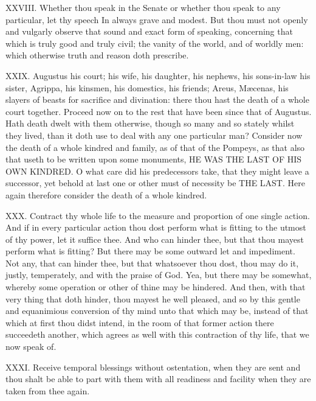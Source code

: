 XXVIII. Whether thou speak in the Senate or whether thou speak to any
particular, let thy speech In always grave and modest. But thou must not
openly and vulgarly observe that sound and exact form of speaking,
concerning that which is truly good and truly civil; the vanity of the
world, and of worldly men: which otherwise truth and reason doth
prescribe.

XXIX. Augustus his court; his wife, his daughter, his nephews, his
sons-in-law his sister, Agrippa, his kinsmen, his domestics, his friends;
Areus, Mæcenas, his slayers of beasts for sacrifice and divination: there
thou hast the death of a whole court together. Proceed now on to the rest
that have been since that of Augustus. Hath death dwelt with them
otherwise, though so many and so stately whilst they lived, than it doth
use to deal with any one particular man? Consider now the death of a
whole kindred and family, as of that of the Pompeys, as that also that
useth to be written upon some monuments, HE WAS THE LAST OF HIS
OWN KINDRED. O what care did his predecessors take, that they
might leave a successor, yet behold at last one or other must of
necessity be THE LAST. Here again therefore consider the
death of a whole kindred.

XXX. Contract thy whole life to the measure and proportion of one single
action. And if in every particular action thou dost perform what is
fitting to the utmost of thy power, let it suffice thee. And who can
hinder thee, but that thou mayest perform what is fitting? But there may
be some outward let and impediment. Not any, that can hinder thee, but
that whatsoever thou dost, thou may do it, justly, temperately, and with
the praise of God. Yea, but there may be somewhat, whereby some operation
or other of thine may be hindered. And then, with that very thing that
doth hinder, thou mayest he well pleased, and so by this gentle and
equanimious conversion of thy mind unto that which may be, instead of that
which at first thou didst intend, in the room of that former action there
succeedeth another, which agrees as well with this contraction of thy
life, that we now speak of.

XXXI. Receive temporal blessings without ostentation, when they are sent
and thou shalt be able to part with them with all readiness and facility
when they are taken from thee again.

